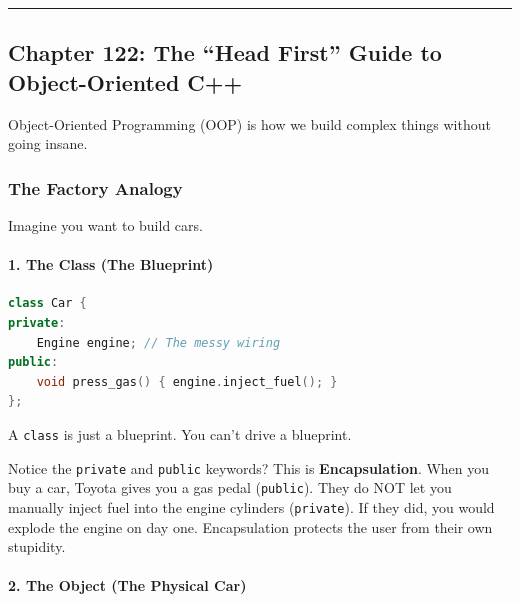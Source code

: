\begin{center}\rule{0.5\linewidth}{0.5pt}\end{center}

\hypertarget{chapter-122-the-head-first-guide-to-object-oriented-c}{%
\subsection{Chapter 122: The ``Head First'' Guide to Object-Oriented
C++}\label{chapter-122-the-head-first-guide-to-object-oriented-c}}

Object-Oriented Programming (OOP) is how we build complex things without
going insane.

\hypertarget{the-factory-analogy}{%
\subsubsection{The Factory Analogy}\label{the-factory-analogy}}

Imagine you want to build cars.

\hypertarget{the-class-the-blueprint}{%
\paragraph{1. The Class (The Blueprint)}\label{the-class-the-blueprint}}

\begin{lstlisting}[language={C++}]
class Car {
private:
    Engine engine; // The messy wiring
public:
    void press_gas() { engine.inject_fuel(); }
};
\end{lstlisting}

A \passthrough{\lstinline!class!} is just a blueprint. You can't drive a
blueprint.

Notice the \passthrough{\lstinline!private!} and
\passthrough{\lstinline!public!} keywords? This is
\textbf{Encapsulation}. When you buy a car, Toyota gives you a gas pedal
(\passthrough{\lstinline!public!}). They do NOT let you manually inject
fuel into the engine cylinders (\passthrough{\lstinline!private!}). If
they did, you would explode the engine on day one. Encapsulation
protects the user from their own stupidity.

\hypertarget{the-object-the-physical-car}{%
\paragraph{2. The Object (The Physical
Car)}\label{the-object-the-physical-car}}

